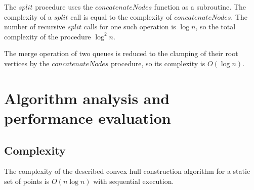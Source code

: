 \documentclass[a4paper,UKenglish,cleveref, autoref]{socg-lipics-v2019}
\begin{document}
	The $split$ procedure uses the $concatenateNodes$ function as a subroutine. The complexity of a $split$ call is equal to the complexity of $concatenateNodes$. The number of recursive $split$ calls for one such operation is $\log n$, so the total complexity of the procedure $\log^2 n$.
	
	The merge operation of two queues is reduced to the clamping of their root vertices by the $concatenateNodes$ procedure, so its complexity is $O(\log n)$.


\section{Algorithm analysis and performance evaluation}
\label{sec:algorithm-analysis-and-performance-evaluation}
\subsection{Complexity}



	\begin{theorem}
		The complexity of the described convex hull construction algorithm for a static set of points is $O(n\log n)$ with sequential execution.
	\end{theorem}
	
\end{document}
